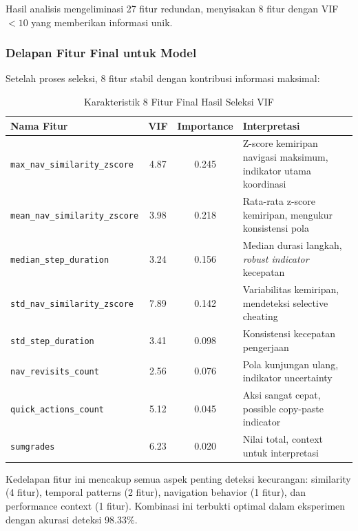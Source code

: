 Hasil analisis mengeliminasi 27 fitur redundan, menyisakan 8 fitur dengan VIF $<10$ yang memberikan informasi unik.

\subsubsection{Delapan Fitur Final untuk Model}
\label{sec:fiturFinal}

Setelah proses seleksi, 8 fitur stabil dengan kontribusi informasi maksimal:

\begin{table}[htbp]
\centering
\caption{Karakteristik 8 Fitur Final Hasil Seleksi VIF}
\label{tabel:fiturFinalKarakteristik}
\begin{tabular}{|p{5cm}|c|c|p{5cm}|}
\hline
\textbf{Nama Fitur} & \textbf{VIF} & \textbf{Importance} & \textbf{Interpretasi} \\
\hline
\texttt{max\_nav\_similarity\_zscore} & 4.87 & 0.245 & Z-score kemiripan navigasi maksimum, indikator utama koordinasi \\
\hline
\texttt{mean\_nav\_similarity\_zscore} & 3.98 & 0.218 & Rata-rata z-score kemiripan, mengukur konsistensi pola \\
\hline
\texttt{median\_step\_duration} & 3.24 & 0.156 & Median durasi langkah, \textit{robust indicator} kecepatan \\
\hline
\texttt{std\_nav\_similarity\_zscore} & 7.89 & 0.142 & Variabilitas kemiripan, mendeteksi selective cheating \\
\hline
\texttt{std\_step\_duration} & 3.41 & 0.098 & Konsistensi kecepatan pengerjaan \\
\hline
\texttt{nav\_revisits\_count} & 2.56 & 0.076 & Pola kunjungan ulang, indikator uncertainty \\
\hline
\texttt{quick\_actions\_count} & 5.12 & 0.045 & Aksi sangat cepat, possible copy-paste indicator \\
\hline
\texttt{sumgrades} & 6.23 & 0.020 & Nilai total, context untuk interpretasi \\
\hline
\end{tabular}
\end{table}

Kedelapan fitur ini mencakup semua aspek penting deteksi kecurangan: similarity (4 fitur), temporal patterns (2 fitur), navigation behavior (1 fitur), dan performance context (1 fitur). Kombinasi ini terbukti optimal dalam eksperimen dengan akurasi deteksi 98.33\%.
